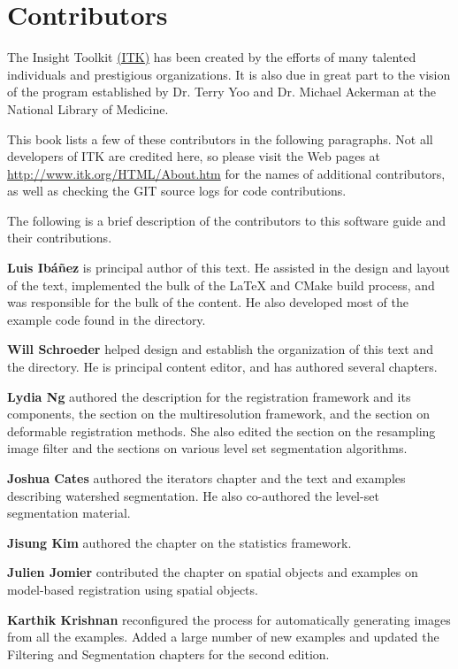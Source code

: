 \chapter*{Contributors}
\noindent

The Insight Toolkit \href{http://www.itk.org}{(ITK)} has been created by the
efforts of many talented individuals and prestigious organizations. It is also
due in great part to the vision of the program established by Dr. Terry Yoo
and Dr. Michael Ackerman at the National Library of Medicine.

This book lists a few of these contributors in the following paragraphs. Not
all developers of ITK are credited here, so please visit the Web pages at
\href{http://www.itk.org/HTML/About.htm}{http://www.itk.org/HTML/About.htm} 
for the names of additional contributors, as well as checking the GIT source
logs for code contributions.

The following is a brief description of the contributors to this software
guide and their contributions.


{\bf Luis Ib\'{a}\~{n}ez} is principal author of this text.
He assisted in the design and layout of the text, implemented the bulk of
the \LaTeX{} and CMake build process, and was responsible for the bulk of 
the content. He also developed most of the example code found in the
 directory.

{\bf Will Schroeder} helped design and establish the organization 
of this text and the  directory. He is principal 
content editor, and has authored several chapters.

{\bf Lydia Ng} authored the description for the registration framework
and its components, the section on the multiresolution framework, and
the section on deformable registration methods. She also edited the
section on the resampling image filter and the sections on various
level set segmentation algorithms.

{\bf Joshua Cates} authored the iterators chapter and the text and examples
describing watershed segmentation. He also co-authored the level-set
segmentation material.

{\bf Jisung Kim} authored the chapter on the statistics framework.

{\bf Julien Jomier} contributed the chapter on spatial objects and examples on
model-based registration using spatial objects.

{\bf Karthik Krishnan} reconfigured the process for automatically generating
images from all the examples. Added a large number of new examples and updated
the Filtering and Segmentation chapters for the second edition.

